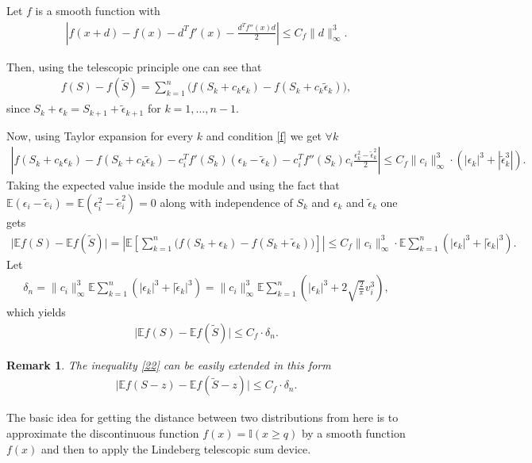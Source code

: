 \documentclass[12pt]{article}
\renewcommand{\=}[1]{\stackrel{#1}{=}} %
\providecommand{\e}{\epsilon}
\newtheorem{re}{Remark}[section]
\begin{document}
Let $f$ is a smooth function with 
\begin{align}\label{f}
\left| f(x + d) - f(x) - d^T f'(x) - \frac{d^T f''(x) d}{2}\right| \le C_f \| d \|_{\infty}^3.
\end{align}
\par Then, using the telescopic principle one can see that 
\begin{align}\label{telescope}
f(S) - f(\tilde{S}) = \sum_{k=1}^n \big(f(S_k + c_k\e_k) - f(S_k + c_k\tilde{\e}_k) \big),
\end{align}
since $S_k + \e_k = S_{k+1} + \tilde{\e}_{k+1}$ for $k = 1, \dots, n - 1$.
\par Now, using Taylor expansion for every $k$ and condition \eqref{f} we get $\forall k$
\begin{align*}
\left| f(S_k + c_k\e_k) - f(S_k + c_k\tilde{\e}_k) - c_i^T f'(S_k) (\e_k - \tilde{\e}_k) - c_i^T f''(S_k)c_i \frac{\e_k^2 - \tilde{\e}_k^2}{2}\right| \le C_f \| c_i \|_{\infty}^3 \cdot (|\e_k|^3 + |\tilde{\e}_k^3|).
\end{align*}
Taking the expected value inside the module and using the fact that $\mathbb{E} (\e_i - \tilde{e}_i) = \mathbb{E} (\e_i^2 - \tilde{e}_i^2) = 0$ along with independence of $S_k$ and $\e_k $ and $\tilde{\e}_k$ one gets 
\begin{align*}
\big| \mathbb{E}f(S) - \mathbb{E}f(\tilde{S}) \big| = \left| \mathbb{E} \left[\sum_{k=1}^n \big(f(S_k + \e_k) - f(S_k + \tilde{\e}_k) \big) \right]\right| \le C_f \| c_i \|_{\infty}^3 \cdot \mathbb{E} \sum_{k=1}^n \left(\big|\e_k\big|^3 + \big|\tilde{\e}_k\big|^3\right).
\end{align*}
Let 
\begin{align}\label{delta}
\delta_n = \| c_i \|_{\infty}^3 \mathbb{E} \sum_{k=1}^n \left(\big|\e_k\big|^3 + \big|\tilde{\e}_k\big|^3\right) = \| c_i \|_{\infty}^3 \mathbb{E} \sum_{k=1}^n \left(\big|\e_k\big|^3 + 2\sqrt{\frac{2}{\pi}}v_i^3\right),
\end{align}
which yields 
\begin{align}\label{22}
\big| \mathbb{E}f(S) - \mathbb{E}f(\tilde{S}) \big| \le C_f \cdot \delta_n.
\end{align}
\begin{re}
The inequality \eqref{22} can be easily extended in this form 
\begin{align}
\big| \mathbb{E}f(S - z) - \mathbb{E}f(\tilde{S} - z) \big| \le C_f \cdot \delta_n.
\end{align}
\end{re}
The basic idea for getting the distance between two distributions from here is to approximate the discontinuous function $f(x) = \mathbb{I}(x \ge q)$ by a smooth function $f(x)$ and then to apply the Lindeberg telescopic sum device.
\end{document}
